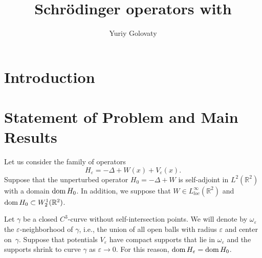 \documentclass[graybox]{svmult}
\newcommand{\dom}{\mathop{\rm dom}}
\newcommand{\Real}{\mathbb R}
\newcommand{\eps}{\varepsilon}
\begin{document}
\title*{Schr\"{o}dinger operators with}
\author{Yuriy Golovaty}

\maketitle






\section{Introduction  }
\label{Sec:Introduction}




\section{Statement of Problem and Main Results}
\label{Sec:Statment}

Let us consider the family of operators
\begin{equation}\label{OprHe}
H_\eps=-\Delta +W(x)+V_\eps(x).
\end{equation}
Suppose that the unperturbed operator $H_0=-\Delta +W$ is self-adjoint in $L^2(\Real^2)$ with a domain $\dom H_0$. In addition, we suppose  that $W\in L^\infty_{loc}(\Real^2)$ and  $\dom H_0\subset W_2^1(\Real^2)$.

Let $\gamma$ be a  closed $C^3$-curve without self-intersection
points. We will denote by $\omega_\eps$ the $\eps$-neighborhood of $\gamma$, i.e., the union of all open balls with radius $\eps$ and center on~$\gamma$.  Suppose that potentials $V_\eps$ have compact supports that lie in $\omega_\eps$ and  the supports  shrink to curve $\gamma$ as $\eps\to 0$. For this reason, $\dom H_\eps=\dom H_0$.
\end{document}
